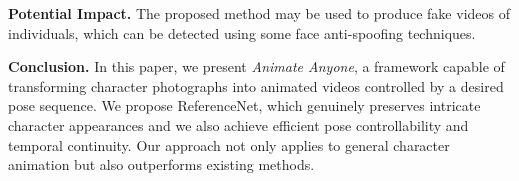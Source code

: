 \noindent
\textbf{Potential Impact. }
The proposed method may be used to produce fake videos of individuals, which can be detected using some face anti-spoofing techniques\cite{anti_color,anti_deep,anti_search}. 

\noindent
\textbf{Conclusion. }
In this paper, we present \textit{Animate Anyone}, a framework capable of transforming character photographs into animated videos controlled by a desired pose sequence.
We propose ReferenceNet, which genuinely preserves intricate character appearances and we also achieve efficient pose controllability and temporal continuity. Our approach not only applies to general character animation but also outperforms existing methods. 

{
    \small
        }

